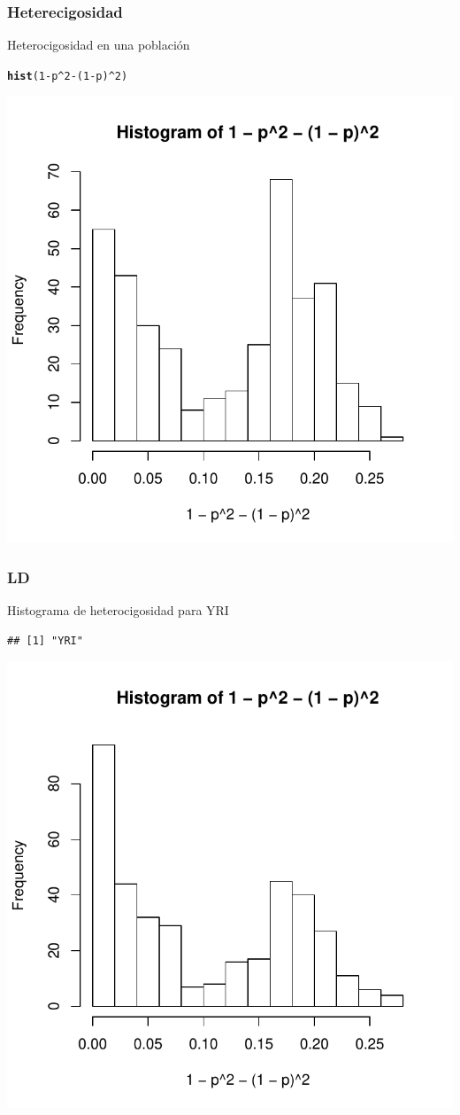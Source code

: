 \documentclass{beamer}\usepackage[]{graphicx}\usepackage[]{color}
\makeatletter
\newcommand{\hlnum}[1]{\textcolor[rgb]{0.686,0.059,0.569}{#1}}%
\newcommand{\hlopt}[1]{\textcolor[rgb]{0,0,0}{#1}}%
\newcommand{\hlstd}[1]{\textcolor[rgb]{0.345,0.345,0.345}{#1}}%
\newcommand{\hlkwd}[1]{\textcolor[rgb]{0.737,0.353,0.396}{\textbf{#1}}}%
\newenvironment{kframe}{%
 \def\at@end@of@kframe{}%
 \ifinner\ifhmode%
  \def\at@end@of@kframe{\end{minipage}}%
  \begin{minipage}{\columnwidth}%
 \fi\fi%
 \def\FrameCommand##1{\hskip\@totalleftmargin \hskip-\fboxsep
 \colorbox{shadecolor}{##1}\hskip-\fboxsep
     \hskip-\linewidth \hskip-\@totalleftmargin \hskip\columnwidth}%
 \MakeFramed {\advance\hsize-\width
   \@totalleftmargin\z@ \linewidth\hsize
   \@setminipage}}%
 {\par\unskip\endMakeFramed%
 \at@end@of@kframe}
\newenvironment{knitrout}{}{} %
\makeatother
\begin{document}
\begin{frame}[fragile]
\frametitle{Heterecigosidad}
Heterocigosidad en una poblaci\'on

\begin{knitrout}\footnotesize
{}\color{fgcolor}\begin{kframe}
\begin{alltt}
\hlkwd{hist}\hlstd{(}\hlnum{1}\hlopt{-}\hlstd{p}\hlopt{^}\hlnum{2}\hlopt{-}\hlstd{(}\hlnum{1}\hlopt{-}\hlstd{p)}\hlopt{^}\hlnum{2}\hlstd{)}
\end{alltt}
\end{kframe}
\includegraphics[width=.45\linewidth]{figure/unnamed-chunk-9-1} 

\end{knitrout}

\end{frame}

\begin{frame}[fragile]
\frametitle{LD}
Histograma de heterocigosidad para YRI
\begin{knitrout}\footnotesize
{}\color{fgcolor}\begin{kframe}
\begin{verbatim}
## [1] "YRI"
\end{verbatim}
\end{kframe}
\includegraphics[width=.45\linewidth]{figure/unnamed-chunk-10-1} 

\end{knitrout}
\end{frame}
\end{document}
